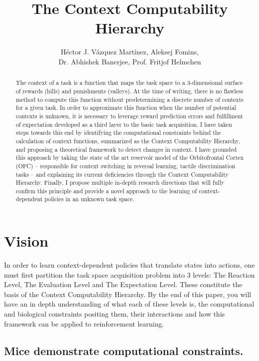 \documentclass[]{article}
\title{The Context Computability Hierarchy}
\author{H\'ector J. V\'azquez Mart\'inez, Aleksej Fomins,\\
	 Dr. Abhishek Banerjee, Prof. Fritjof Helmchen}
\begin{document}
\maketitle

\begin{abstract}
The context of a task is a function that maps the task space to a 3-dimensional surface of rewards (hills) and punishments (valleys).  At the time of writing, there is no flawless method to compute this function without predetermining a discrete number of contexts for a given task.  In order to approximate this function when the number of potential contexts is unknown, it is necessary to leverage reward prediction errors and fulfillment of expectation developed as a third layer to the basic task acquisition.  I have taken steps towards this end by identifying the computational constraints behind the calculation of context functions, summarized as the Context Computability Hierarchy, and proposing a theoretical framework to detect changes in context.  I have grounded this approach by taking the state of the art reservoir model of the Orbitofrontal Cortex (OFC) -- responsible for context switching in reversal learning, tactile discrimination tasks -- and explaining its current deficiencies through the Context Computability Hierarchy.  Finally, I propose multiple in-depth research directions that will fully confirm this principle and provide a novel approach to the learning of context-dependent policies in an unknown task space.
\end{abstract}


\section{Vision}
In order to learn context-dependent policies that translate states into actions, one must first partition the task space acquisition problem into 3 levels: The Reaction Level, The Evaluation Level and The Expectation Level.  These constitute the basis of the Context Computability Hierarchy.  By the end of this paper, you will have an in depth understanding of what each of these levels is, the computational and biological constraints positing them, their interactions and how this framework can be applied to reinforcement learning.

\subsection{Mice demonstrate computational constraints.}
\end{document}
